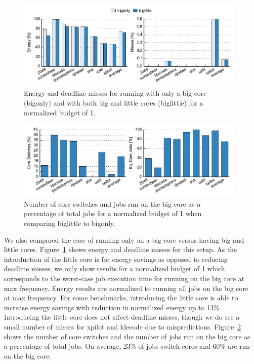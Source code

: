 \begin{figure}
  \begin{center}
    \includegraphics{exec_time_prediction/data/hetero_big_100_em.pdf}
    \caption{Energy and deadline misses for running with only a big core
    (bigonly) and with both big and little cores (biglittle) for a normalized
    budget of 1.}
    \label{fig:exec_time_prediction.evaluation.hetero_big_em}
  \end{center}
\end{figure}

\begin{figure}
  \begin{center}
    \includegraphics{exec_time_prediction/data/hetero_big_counts.pdf}
    \caption{Number of core switches and jobs run on the big core as a
    percentage of total jobs for a normalized budget of 1 when comparing
    biglittle to bigonly.}
    \label{fig:exec_time_prediction.evaluation.hetero_big_counts}
  \end{center}
\end{figure}

We also compared the case of running only on a big core versus having big and
little cores. Figure~\ref{fig:exec_time_prediction.evaluation.hetero_big_em} shows
energy and deadline misses for this setup. As the introduction of the little
core is for energy savings as opposed to reducing deadline misses, we only show
results for a normalized budget of 1 which corresponds to the worst-case job
execution time for running on the big core at max frequency. Energy results
are normalized to running all jobs on the big core at max frequency. For some
benchmarks, introducing the little core is able to increase energy savings with
reduction in normalized energy up to 13\%. Introducing the little core does not
affect deadline misses, though we do see a small number of misses for xpilot
and ldecode due to mispredictions.
Figure~\ref{fig:exec_time_prediction.evaluation.hetero_big_counts} shows the
number of core switches and the number of jobs run on the big core as a
percentage of total jobs. On average, 23\% of jobs switch cores and 60\% are
run on the big core.

